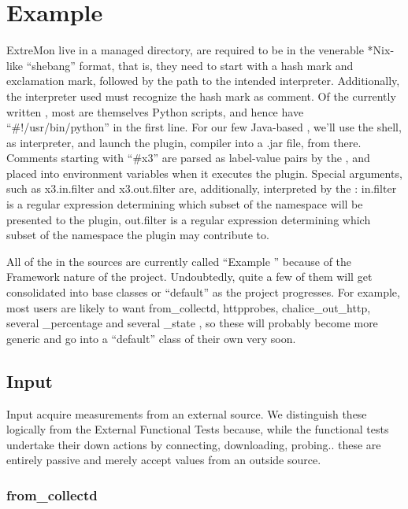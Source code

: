 \chapter{Example \witches{}}

ExtreMon \witches{} live in a managed directory, are required to be in the
venerable *Nix-like ``shebang'' format, that is, they need to start with
a hash mark and exclamation mark, followed by the path to the intended
interpreter. Additionally, the interpreter used must recognize the hash
mark as comment. Of the currently written \witches{}, most are themselves
Python scripts, and hence have ``\#!/usr/bin/python'' in the first line.
For our few Java-based \witches{}, we'll use the shell, as interpreter,
and launch the plugin, compiler into a .jar file, from there.  Comments
starting with ``\#x3'' are parsed as label-value pairs by the \coven{},
and placed into environment variables when it executes the plugin. Special
arguments, such as x3.in.filter and x3.out.filter are, additionally,
interpreted by the \coven{}: in.filter is a regular expression determining
which subset of the namespace will be presented to the plugin, out.filter
is a regular expression determining which subset of the namespace the
plugin may contribute to.

All of the \witches{} in the sources are currently called ``Example \witches{}''
because of the Framework nature of the project. Undoubtedly, quite a few
of them will get consolidated into base classes or ``default'' \witches{}
as the project progresses. For example, most users are likely to want
from\_collectd, httpprobes, chalice\_out\_http, several \_percentage and
several \_state \witches{}, so these will probably become more generic
and go into a ``default'' class of their own very soon.

\section{Input \witches{}}

Input \witches{} acquire measurements from an external source. We
distinguish these logically from the External Functional Tests because,
while the functional tests undertake their down actions by connecting,
downloading, probing.. these are entirely passive and merely accept
values from an outside source.

\subsection{from\_collectd}

